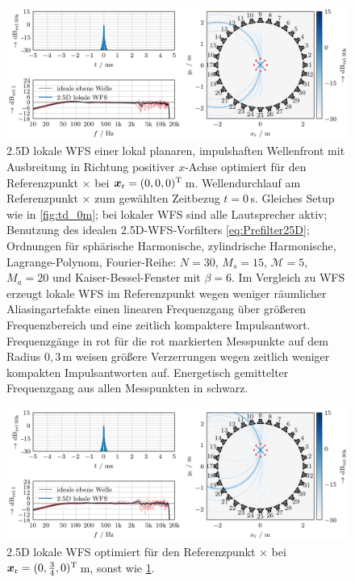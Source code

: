 \begin{figure}[t]
\centering
\begin{plotfigures}
\includegraphics[width=145mm]{../python/lwfs25d_circSSD_time_domain_center_py_DEU.png}
\end{plotfigures}
\caption{2.5D lokale WFS einer lokal planaren, impulshaften
Wellenfront mit Ausbreitung in Richtung positiver $x$-Achse optimiert
für den Referenzpunkt $\times$ bei $\bm{x}_\mathrm{r}=(0,0,0)^\mathrm{T}$\,m.
Wellendurchlauf am Referenzpunkt $\times$ zum gewählten Zeitbezug $t=0$\,s.
Gleiches Setup wie in \Abb\ref{fig:td_0m}; bei lokaler WFS sind alle Lautsprecher
aktiv; Benutzung des idealen 2.5D-WFS-Vorfilters \eqref{eq:Prefilter25D};
%
%
Ordnungen für
sphärische Harmonische,
zylindrische Harmonische,
Lagrange-Polynom,
Fourier-Reihe:
$N=30$, $M_s=15$, $\mathcal{M}=5$, $M_a=20$ und
Kaiser-Bessel-Fenster mit $\beta=6$.
%
Im Vergleich zu WFS erzeugt lokale WFS im Referenzpunkt wegen weniger
räumlicher Aliasingartefakte einen linearen Frequenzgang über größeren
Frequenzbereich und eine zeitlich kompaktere Impulsantwort.
%
Frequenzgänge in rot für die rot markierten Messpunkte auf dem Radius $0{,}3$\,m weisen
größere Verzerrungen wegen zeitlich weniger kompakten Impulsantworten auf.
%
Energetisch gemittelter Frequenzgang aus allen Messpunkten in schwarz.
%
\cc
}
\label{fig:td_lwfs_center}
\end{figure}
%
\begin{figure}[h!]
\centering
\begin{plotfigures}
\includegraphics[width=145mm]{../python/lwfs25d_circSSD_time_domain_offcenter_py_DEU.png}
\end{plotfigures}
\caption{2.5D lokale WFS optimiert für den Referenzpunkt
$\times$ bei $\bm{x}_\mathrm{r}=(0,\frac{3}{4},0)^\mathrm{T}$\,m, sonst wie \Abb\ref{fig:td_lwfs_center}.
%
\cc
}
\label{fig:td_lwfs_offcenter}
\end{figure}



